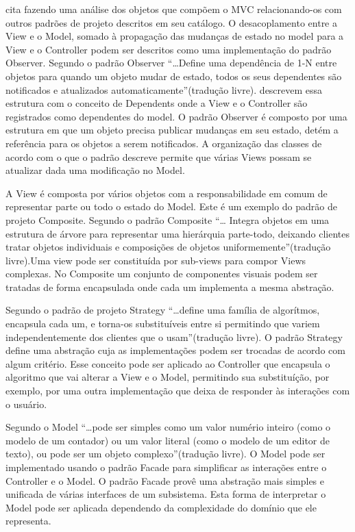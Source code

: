 \documentclass[conference]{IEEEtran}
\begin{document}
 cita  fazendo uma análise dos
objetos que compõem o MVC relacionando-os com outros padrões de projeto
descritos em seu catálogo.
O desacoplamento entre a View e o Model, somado à propagação das mudanças de
estado no model para a View e o Controller podem ser
descritos como uma implementação do padrão Observer. Segundo \cite{gof} o padrão
Observer ``\ldots Define uma dependência de 1-N entre objetos para quando um
objeto mudar de estado, todos os seus dependentes são notificados e atualizados
automaticamente''(tradução livre).  descrevem essa
estrutura com o conceito de Dependents onde a View e o Controller são
registrados como dependentes do model. O padrão Observer é composto por uma
estrutura em que um objeto precisa publicar mudanças em seu estado, detém a
referência para os objetos a serem notificados. A organização das classes de
acordo com o que o padrão descreve permite que várias Views possam se atualizar
dada uma modificação no Model.

A View é composta por vários objetos com a responsabilidade em comum de
representar parte ou todo o estado do Model. Este é um exemplo do padrão de
projeto Composite. Segundo  o padrão Composite ``\ldots
Integra objetos em uma estrutura de árvore para representar uma hierárquia
parte-todo, deixando clientes tratar objetos individuais e composições de
objetos uniformemente''(tradução livre).Uma view pode ser constituída por
sub-views para compor Views complexas. No Composite  um conjunto de componentes
visuais podem ser tratadas de forma encapsulada onde cada um implementa a
mesma abstração. 

Segundo  o padrão de projeto Strategy ``\ldots define uma
família de algorítmos, encapsula cada um, e torna-os substituíveis entre si
permitindo que variem independentemente dos clientes que o usam''(tradução
livre). O padrão Strategy define uma abstração cuja as implementações podem ser
trocadas de acordo com algum critério. Esse conceito pode ser aplicado ao
Controller que encapsula o algoritmo que vai alterar a View e o Model,
permitindo sua substituíção, por exemplo, por uma outra implementação que deixa
de responder às interações com o usuário.

Segundo  o Model ``\ldots pode ser simples como
um valor numério inteiro (como o modelo de um contador) ou um valor literal
(como o modelo de um editor de texto), ou pode ser um objeto complexo''(tradução
livre). O Model pode ser implementado usando o padrão Facade para simplificar
as interações entre o Controller e o Model. O padrão Facade provê
uma abstração mais simples e unificada de várias interfaces de um
subsistema\cite{gof}. Esta forma de interpretar o Model pode ser aplicada
dependendo da complexidade do domínio que ele representa.
\end{document}
